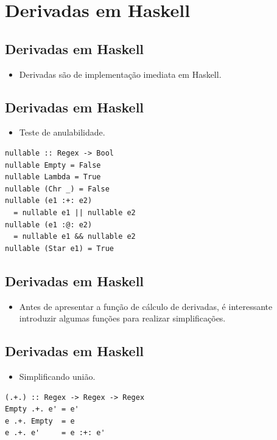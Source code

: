 \documentclass[11pt]{article}
\begin{document}
\section*{Derivadas em Haskell}
\label{sec:org6821937}

\subsection*{Derivadas em Haskell}
\label{sec:org6cd7e67}

\begin{itemize}
\item Derivadas são de implementação imediata em Haskell.
\end{itemize}
\subsection*{Derivadas em Haskell}
\label{sec:org610f93b}

\begin{itemize}
\item Teste de anulabilidade.
\end{itemize}

\begin{verbatim}
nullable :: Regex -> Bool
nullable Empty = False
nullable Lambda = True
nullable (Chr _) = False
nullable (e1 :+: e2)
  = nullable e1 || nullable e2
nullable (e1 :@: e2)
  = nullable e1 && nullable e2
nullable (Star e1) = True
\end{verbatim}
\subsection*{Derivadas em Haskell}
\label{sec:org3c2e015}

\begin{itemize}
\item Antes de apresentar a função de cálculo de derivadas, é interessante
introduzir algumas funções para realizar simplificações.
\end{itemize}
\subsection*{Derivadas em Haskell}
\label{sec:orgd557451}

\begin{itemize}
\item Simplificando união.
\end{itemize}

\begin{verbatim}
(.+.) :: Regex -> Regex -> Regex
Empty .+. e' = e'
e .+. Empty  = e
e .+. e'     = e :+: e'
\end{verbatim}
\end{document}
